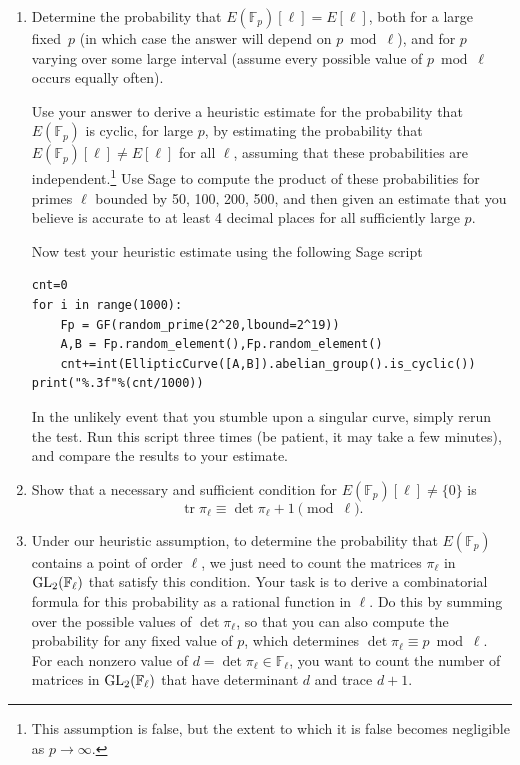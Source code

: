 \documentclass[11pt]{article}
\newcommand{\Fl}{\mathbb{F}_\ell}
\newcommand{\Fp}{\mathbb{F}_p}
\newcommand{\GL}{{\rm GL}}
\newcommand{\tr}{\operatorname{tr}}
\begin{document}
\begin{enumerate}[{\bf (a)}]
\item
Determine the probability that $E(\Fp)[\ell]=E[\ell]$, both for a large fixed~$p$ (in which case the answer will depend on $p\bmod \ell$), and for $p$ varying over some large interval (assume every possible value of $p\bmod \ell$ occurs equally often).

Use your answer to derive a heuristic estimate for the probability that $E(\Fp)$ is cyclic, for large $p$, by estimating the probability that $E(\Fp)[\ell]\ne E[\ell]$ for all $\ell $,  assuming that these probabilities are independent.\footnote{This assumption is false, but the extent to which it is false becomes negligible as $p\to \infty$.}
Use Sage to compute the product of these probabilities for primes $\ell$ bounded by 50, 100, 200, 500, and then given an estimate that you believe is accurate to at least 4 decimal places for all sufficiently large $p$.

Now test your heuristic estimate using the following Sage script
\begin{lstlisting}
cnt=0
for i in range(1000):
    Fp = GF(random_prime(2^20,lbound=2^19))
    A,B = Fp.random_element(),Fp.random_element()
    cnt+=int(EllipticCurve([A,B]).abelian_group().is_cyclic())
print("%.3f"%(cnt/1000))
\end{lstlisting}
In the unlikely event that you stumble upon a singular curve, simply rerun the test.
Run this script three times (be patient, it may take a few minutes), and compare the results to your estimate. 

\item
Show that a necessary and sufficient condition for $E(\Fp)[\ell]\ne\{0\}$ is
\vspace{-2pt}
\[
\tr\pi_\ell\equiv\det\pi_\ell + 1\pmod \ell.
\]

\item
Under our heuristic assumption, to determine the probability that $E(\Fp)$ contains a point of order $\ell$, we just need to count the matrices $\pi_\ell$ in $\GL_2(\Fl)$ that satisfy this condition.
Your task is to derive a combinatorial formula for this probability as a rational function in $\ell$.
Do this by summing over the possible values of $\det\pi_\ell$, so that you can also compute the probability for any fixed value of $p$, which determines $\det\pi_\ell \equiv p\bmod \ell$. 
For each nonzero value of $d=\det\pi_\ell\in\Fl$, you want to count the number of matrices in $\GL_2(\Fl)$ that have determinant $d$ and trace $d+1$.


\end{enumerate}
\end{document}
